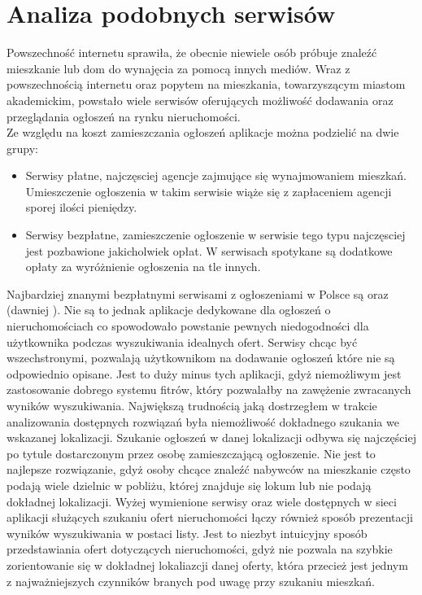 \section{Analiza podobnych serwisów}
\label{sec:analizaSerwisow}
Powszechność internetu sprawiła, że obecnie niewiele osób próbuje znaleźć mieszkanie lub dom do wynajęcia za pomocą innych mediów\cite{tns}. Wraz z powszechnością internetu oraz popytem na mieszkania, towarzyszącym miastom akademickim, powstało wiele serwisów oferujących możliwość dodawania oraz przeglądania ogłoszeń na rynku nieruchomości.\\
Ze względu na koszt zamieszczania ogłoszeń aplikacje można podzielić na dwie grupy:
\begin{itemize}
\item Serwisy płatne, najczęsciej agencje zajmujące się wynajmowaniem mieszkań. Umieszczenie ogłoszenia w takim serwisie wiąże się z zapłaceniem agencji sporej ilości pieniędzy.
\item Serwisy bezpłatne, zamieszczenie ogłoszenie w serwisie tego typu najczęsciej jest pozbawione jakicholwiek opłat. W serwisach spotykane są dodatkowe opłaty za wyróżnienie ogłoszenia na tle innych.
\end{itemize}
Najbardziej znanymi bezpłatnymi serwisami z ogłoszeniami w Polsce są  oraz  (dawniej ). Nie są to jednak aplikacje dedykowane dla ogłoszeń o nieruchomościach co spowodowało powstanie pewnych niedogodności dla użytkownika podczas wyszukiwania idealnych ofert. Serwisy chcąc być wszechstronymi, pozwalają użytkownikom na dodawanie ogłoszeń które nie są odpowiednio opisane. Jest to duży minus tych aplikacji, gdyż niemożliwym jest zastosowanie dobrego systemu fitrów, który pozwalałby na zawężenie zwracanych wyników wyszukiwania. Największą trudnością jaką dostrzegłem w trakcie analizowania dostępnych rozwiązań była niemożliwość dokładnego szukania we wskazanej lokalizacji. Szukanie ogłoszeń w danej lokalizacji odbywa się najczęściej po tytule dostarczonym przez osobę zamieszczającą ogłoszenie. Nie jest to najlepsze rozwiązanie, gdyż osoby chcące znaleźć nabywców na mieszkanie często podają wiele dzielnic w pobliżu, której znajduje się lokum lub nie podają dokładnej lokalizacji. Wyżej wymienione serwisy oraz wiele dostępnych w sieci aplikacji służących szukaniu ofert nieruchomości łączy również sposób prezentacji wyników wyszukiwania w postaci listy. Jest to niezbyt intuicyjny sposób przedstawiania ofert dotyczących nieruchomości, gdyż nie pozwala na szybkie zorientowanie się w dokładnej lokaliazcji danej oferty, która przecież jest jednym z najważniejszych czynników branych pod uwagę przy szukaniu mieszkań.

